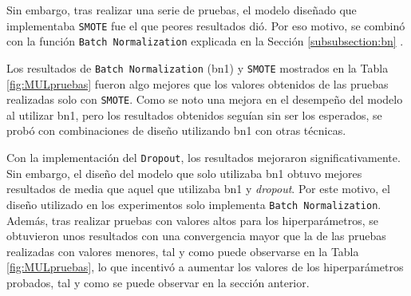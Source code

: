 \begin{table}[H]
\centering
{}
    \caption{Resultados de los diferentes diseños probados para el modelo de clasifcación multiclase.}
    \label{fig:MULpruebas}
\end{table}

Sin embargo, tras realizar una serie de pruebas, el modelo diseñado que implementaba  \texttt{SMOTE} fue el que peores resultados dió. Por eso motivo, se combinó con la función \texttt{Batch Normalization} explicada en la Sección \ref{subsubsection:bn} .

Los resultados de \texttt{Batch Normalization} (bn1) y \texttt{SMOTE} mostrados en la Tabla \ref{fig:MULpruebas} fueron algo mejores que los valores obtenidos de las pruebas realizadas solo con \texttt{SMOTE}. Como se noto una mejora en el desempeño del modelo al utilizar bn1, pero los resultados obtenidos seguían sin ser los esperados, se probó con combinaciones de diseño utilizando bn1 con otras técnicas.

Con la implementación del \texttt{Dropout}, los resultados mejoraron significativamente. Sin embargo, el diseño del modelo que solo utilizaba bn1 obtuvo mejores resultados de media que aquel que utilizaba bn1 y \textit{dropout}. Por este motivo, el diseño utilizado en los experimentos solo implementa \texttt{Batch Normalization}. Además, tras realizar pruebas con valores altos para los hiperparámetros, se obtuvieron unos resultados con una convergencia mayor que la de las pruebas realizadas con valores menores, tal y como puede observarse en la Tabla \ref{fig:MULpruebas}, lo que incentivó a aumentar los valores de los hiperparámetros probados, tal y como se puede observar en la sección anterior.




